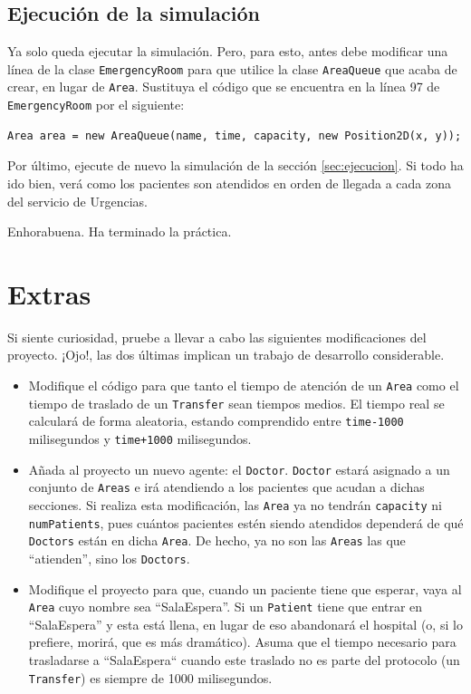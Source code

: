 \documentclass[10pt,a4paper,spanish]{article}
\newcommand{\code}[1]{\texttt{#1}}
\begin{document}
\subsection{Ejecución de la simulación}

Ya solo queda ejecutar la simulación. Pero, para esto, antes debe modificar una línea de la clase \code{EmergencyRoom} para que utilice la clase \code{AreaQueue} que acaba de crear, en lugar de \code{Area}. Sustituya el código que se encuentra en la línea 97 de \code{EmergencyRoom} por el siguiente:

\begin{verbatim}
Area area = new AreaQueue(name, time, capacity, new Position2D(x, y));
\end{verbatim}

Por último, ejecute de nuevo la simulación de la sección \ref{sec:ejecucion}. Si todo ha ido bien, verá como los pacientes son atendidos en orden de llegada a cada zona del servicio de Urgencias.

Enhorabuena. Ha terminado la práctica.

\section{Extras} 

Si siente curiosidad, pruebe a llevar a cabo las siguientes modificaciones del proyecto. ¡Ojo!, las dos últimas implican un trabajo de desarrollo considerable.

\begin{itemize}
    \item Modifique el código para que tanto el tiempo de atención de un \code{Area} como el tiempo de traslado de un \code{Transfer} sean tiempos medios. El tiempo real se calculará de forma aleatoria, estando comprendido entre \code{time-1000} milisegundos y \code{time+1000} milisegundos.
    \item Añada al proyecto un nuevo agente: el \code{Doctor}. \code{Doctor} estará asignado a un conjunto de \code{Areas} e irá atendiendo a los pacientes que acudan a dichas secciones. Si realiza esta modificación, las \code{Area} ya no tendrán \code{capacity} ni \code{numPatients}, pues cuántos pacientes estén siendo atendidos dependerá de qué \code{Doctors} están en dicha \code{Area}. De hecho, ya no son las \code{Areas} las que ``atienden'', sino los \code{Doctors}.
    \item Modifique el proyecto para que, cuando un paciente tiene que esperar, vaya al \code{Area} cuyo nombre sea ``SalaEspera''. Si un \code{Patient} tiene que entrar en ``SalaEspera'' y esta está llena, en lugar de eso abandonará el hospital (o, si lo prefiere, morirá, que es más dramático). Asuma que el tiempo necesario para trasladarse a ``SalaEspera`` cuando este traslado no es parte del protocolo (un \code{Transfer}) es siempre de 1000 milisegundos.
\end{itemize}
\end{document}
